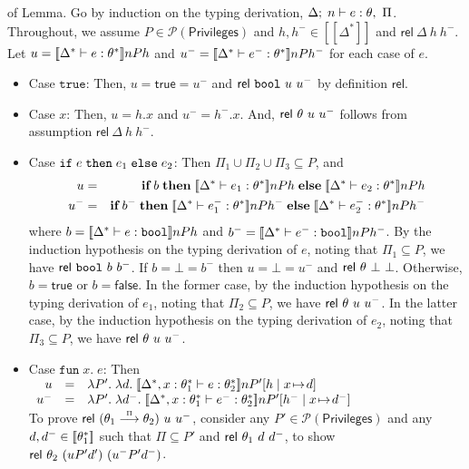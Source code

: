 \documentclass[submission,copyright,creativecommons]{eptcs}
\newcommand{\ifthenelse}[3]{\IF\;#1\;\THEN\;#2\;\ELSE\;#3}
\newcommand{\mifthenelse}[3]{\MIF\;#1\;\MTHEN\;#2\;\MELSE\;#3}
\newcommand{\BOOL}{\mbox{\texttt{bool}}}
\newcommand{\ELSE}{\mbox{\texttt{else}}}
\newcommand{\IF}{\mbox{\texttt{if}}}
\newcommand{\THEN}{{\texttt{then}}}
\newcommand{\MTHEN}{{\textbf{then}}}
\newcommand{\MELSE}{{\textbf{else}}}
\newcommand{\MIF}{{\textbf{if}}}
\newcommand{\TRUE}{{\texttt{true}}}
\renewcommand{\P}{\mathcal{P}}
\newcommand{\ldb}{[\![}
\newcommand{\rdb}{]\!]}
\newcommand{\means}[1]{\ldb {#1}\rdb}
\newcommand{\union}{\cup}
\newcommand{\proves}{\vdash}
\newcommand{\ext}[3]{[#1\mid#2\!\mapsto\!#3]}
\newcommand{\lam}[2]{\lambda #1.\; #2} \newcommand{\all}[2]{\forall #1.\; #2}
\def\lpields#1{\stackrel{#1}{\longrightarrow}}
\newcommand{\annoto}[1]{\lpields {\scriptscriptstyle #1}}
\newcommand{\PRIV}{{\mathsf{Privileges}}}
\newcommand{\Rel}{\textsf{rel}}
\newcommand{\LAM}[2]{{\mathtt{fun}\; #1.\; #2}}
\newcommand{\n}{n} \newcommand{\p}{p} \newcommand{\Ps}{\Pi} \newcommand{\h}{h}
\newenvironment{xproof}{\begin{trivlist}\item[\hskip\labelsep{\bf  
Proof:}]}{\end{trivlist}}
\begin{document}
\begin{xproof}
of Lemma. Go by induction on the typing derivation, 
$\Delta;\;\n\proves e:\th,~\Ps$.
Throughout, we assume $P\in\P(\PRIV)$ and $\h,\h^-\in\means{\Delta^*}$ and 
$\Rel~\Delta~\h~\h^-$. Let
$u=\means{\Delta^*\proves e:\th^*}\n P \h$ and 
$u^-=\means{\Delta^*\proves e^-:\th^*}\n P \h^-$ for each case of $e$.
\begin{itemize}
\item Case $\TRUE$:
Then, $u = \mathsf{true} = u^-$ and $\Rel~ {\BOOL}~u~u^-$ by definition $\Rel$.
\item Case $x$:
Then, $u=\h.x$ and $u^-=\h^-.x$. And, $\Rel~\th~u~u^-$ follows
from assumption $\Rel~ {\Delta}~\h~\h^-$.
\item Case $\ifthenelse{e}{e_1}{e_2}$:
Then $\Ps_1\union\Ps_2\union\Ps_3\subseteq P$, and 
\begin{eqnarray*}
u&=&\mifthenelse{b}{\means{\Delta^*\proves e_1:\th^*}\n P \h}
                   {\means{\Delta^*\proves e_2:\th^*}\n P \h}\\
u^-&=&\mifthenelse{b^-}{\means{\Delta^*\proves e_1^-:\th^*}\n P \h^-}
                       {\means{\Delta^*\proves e_2^-:\th^*}\n P \h^-}
\end{eqnarray*}
where 
$b=\means{\Delta^*\proves e:\BOOL}\n P \h$ and
$b^-=\means{\Delta^*\proves e^-:\BOOL}\n P \h^-$. By the induction hypothesis
on the typing derivation of $e$, noting that $\Ps_1\subseteq P$, we have 
$\Rel~\BOOL~b~b^-$.
If $b=\bot=b^-$ then $u=\bot=u^-$ and $\Rel~\th~\bot~\bot$.
Otherwise, $b=\mathsf{true}$ or $b=\mathsf{false}$. In the
former case, by the induction hypothesis on the typing derivation of 
$e_1$, noting that $\Ps_2\subseteq P$, we have 
$\Rel~ {\th}~u~u^-$. In the latter case, by the induction hypothesis on 
the typing derivation of $e_2$, noting that $\Ps_3\subseteq P$, we have 
$\Rel~ {\th}~u~u^-$. 
\item Case $\LAM{x}{e}$:
Then 
\(\begin{array}[t]{rcl}
u&=&
\lam{P'}
   {\lam{d}
        {\means{\Delta^*,x:\th_{1}^*\proves e:\th_{2}^*}\n P'\ext{\h}{x}{d}}}\\
u^-&=&
\lam{P'}
   {\lam{d^-}
        {\means{\Delta^*,x:\th_{1}^*\proves e^-:\th_{2}^*}\n P'\ext{\h^-}{x}{d^-}}}
\end{array}\)
\\
To prove $\Rel~(\th_{1}\annoto{\Ps}\th_{2})~u~u^-$, consider any 
$P'\in\P(\PRIV)$ and any $d,d^-\in\means{\th_{1}^*}$ such that 
$\Ps\subseteq P'$ and $\Rel~ {\th_{1}}~d~d^-$, to show 
$\Rel~\th_2~(u P' d')~(u^-P'd^-)$.

\end{itemize}
\end{xproof}
\end{document}
